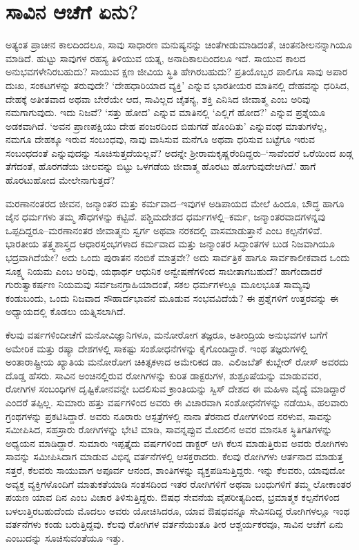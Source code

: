 \section*{ಸಾವಿನ ಆಚೆಗೆ ಏನು?}


ಅತ್ಯಂತ ಪ್ರಾಚೀನ ಕಾಲದಿಂದಲೂ, ಸಾವು ಸಾಧಾರಣ ಮನುಷ್ಯನನ್ನು ಚಿಂತೆಗೀಡು\-ಮಾಡಿ\-ದಂತೆ, ಚಿಂತನಶೀಲನನ್ನಾಗಿಯೂ ಮಾಡಿದೆ. ಹುಟ್ಟು ಸಾವುಗಳ ರಹಸ್ಯ ತಿಳಿಯುವ ಯತ್ನ, ಅನಾದಿಕಾಲದಿಂದಲೂ ಇದೆ. ಸಾಯುವ ಕಾಲದ ಅನುಭವಗಳೇನಿರಬಹುದು? ಸಾಯುವ ಕ್ಷಣ ಜೀವಿಯ ಸ್ಥಿತಿ ಹೇಗಿರಬಹುದು? ಪ್ರತಿಯೊಬ್ಬರ ಪಾಲಿಗೂ ಸಾವು ಅಪಾರ ದುಃಖ, ಸಂಕಟಗಳನ್ನು ತರುವುದೇ? ‘ದೇಹಧಾರಿಯಾದ ವ್ಯಕ್ತಿ’ ಎನ್ನುವ ಭಾರತೀಯರ ಮಾತಿನಲ್ಲಿ ದೇಹವನ್ನು ಧರಿಸಿದ, ದೇಹಕ್ಕೆ ಅತೀತವಾದ ಅಥವಾ ಬೇರೆಯೇ ಆದ, ಸಾವಿಲ್ಲದ ಚೈತನ್ಯ, ಶಕ್ತಿ ಎನಿಸಿದ ಜೀವಾತ್ಮ ಎಂಬ ಅರಿವು ನಮಗಾಗುವುದು. ಇದು ನಿಜವೆ? ‘ಸತ್ತು ಹೋದ’ ಎನ್ನುವ ಮಾತಿನಲ್ಲಿ ‘ಎಲ್ಲಿಗೆ ಹೋದ?’ ಎನ್ನುವ ಪ್ರಶ್ನೆಯೂ ಅಡಕವಾಗಿದೆ. ‘ಅವನ ಪ್ರಾಣಪಕ್ಷಿಯು ದೇಹ ಪಂಜರದಿಂದ ಬಿಡುಗಡೆ ಹೊಂದಿತು’ ಎನ್ನುವಂಥ ಮಾತುಗಳೆಲ್ಲ, ನಮಗೂ ದೇಹಕ್ಕೂ ಇರುವ ಸಂಬಂಧವು, ನಾವು ವಾಸಿಸುವ ಮನೆಗೂ ಅಥವಾ ಧರಿಸುವ ಬಟ್ಟೆಗೂ ಇರುವ ಸಂಬಂಧದಂತೆ ಎನ್ನುವುದನ್ನು ಸೂಚಿಸುತ್ತದೆಯಲ್ಲವೆ? ಅದನ್ನೇ ಶ‍್ರೀರಾಮಕೃಷ್ಣರೆಂದಿದ್ದರು–‘ಸಾವೆಂದರೆ ಒರೆಯಿಂದ ಖಡ್ಗ ತೆಗೆದಂತೆ, ಹೊರಗಡೆಯ ಚೀಲವನ್ನು ಬಿಟ್ಟು ಒಳಗಡೆಯ ಜೀವಾತ್ಮ ಹೊರಟು ಹೋಗುವುದೇ\break ಆಗಿದೆ.’ ಹಾಗೆ ಹೊರಟುಹೋದ ಮೇಲೇನಾಗುತ್ತದೆ?

ಮರಣಾನಂತರದ ಜೀವನ, ಜನ್ಮಾಂತರ ಮತ್ತು ಕರ್ಮವಾದ–ಇವುಗಳ ಅಡಿಪಾಯದ ಮೇಲೆ ಹಿಂದೂ, ಬೌದ್ಧ ಹಾಗೂ ಜೈನ ಧರ್ಮಗಳು ತಮ್ಮ ಸೌಧಗಳನ್ನು ಕಟ್ಟಿವೆ. ಪಶ್ಚಿಮದೇಶದ ಧರ್ಮಗಳಲ್ಲಿ–ಕರ್ಮ, ಜನ್ಮಾಂತರವಾದಗಳನ್ನವು ಒಪ್ಪದಿದ್ದರೂ–ಮರಣಾನಂತರ ಜೀವಾತ್ಮನು ಸ್ವರ್ಗ ಅಥವಾ ನರಕದಲ್ಲಿ ವಾಸಮಾಡುತ್ತಾನೆ ಎಂಬ ಕಲ್ಪನೆಗಳಿವೆ. ಭಾರತೀಯ ತತ್ತ್ವಶಾಸ್ತ್ರದ ಆಧಾರಸ್ತಂಭಗಳಾದ ಕರ್ಮವಾದ ಮತ್ತು ಜನ್ಮಾಂತರ ಸಿದ್ಧಾಂತಗಳ ಬುಡ ನಿಜವಾಗಿಯೂ ಭದ್ರ\-ವಾಗಿದೆಯೇ? ಅದು ಒಂದು ಪುರಾತನ ನಂಬಿಕೆ ಮಾತ್ರವೇ? ಅದು ಸಾರ್ವತ್ರಿಕ ಹಾಗೂ ಸಾರ್ವಕಾಲೀಕವಾದ ಒಂದು ಸೂಕ್ಷ್ಮ ನಿಯಮ ಎಂಬ ಅರಿವು, ಯಥಾರ್ಥ ಆಧುನಿಕ ಅನ್ವೇಷಣೆಗಳಿಂದ ಸಾಬೀತಾಗಬಹುದೆ? ಹಾಗೆಂದಾದರೆ ಗುರುತ್ವಾಕರ್ಷಣ ನಿಯಮವು ಸರ್ವಜನಗ್ರಾಹಿಯಾದಂತೆ, ಸಕಲ ಧರ್ಮಗಳಲ್ಲೂ ಮೂಲಭೂತ ಸಾಮ್ಯವು ಕಂಡುಬಂದು, ಒಂದು ನಿಜವಾದ ಸೌಹಾರ್ದಭಾವನೆ ಮೂಡುವ ಸಂಭವವಿದೆಯೆ? ಈ ಪ್ರಶ್ನೆಗಳಿಗೆ ಉತ್ತರವನ್ನು ಈ ಅಧ್ಯಾಯ\-ದಲ್ಲಿ ಕೊಡಲು ಯತ್ನಿಸಲಾಗಿದೆ.

ಕೆಲವು ವರ್ಷಗಳಿಂದೀಚೆಗೆ ಮನೋವಿಜ್ಞಾನಿಗಳೂ, ಮನೋರೋಗ ತಜ್ಞರೂ, ಅತೀಂದ್ರಿಯ ಅನುಭವಗಳ ಬಗೆಗೆ ಅಮೇರಿಕ ಮತ್ತು ರಷ್ಯಾ ದೇಶಗಳಲ್ಲಿ ಸಾಕಷ್ಟು ಸಂಶೋಧನೆಗಳನ್ನು ಕೈಗೊಂಡಿದ್ದಾರೆ. ಇಂಥ ತಜ್ಞರುಗಳಲ್ಲಿ ಅಂತಾರಾಷ್ಟ್ರೀಯ ಖ್ಯಾತಿಯ ಮನೋರೋಗ ಚಿಕಿತ್ಸಕಳಾದ ಅಮೇರಿಕದ ಡಾ.\ ಎಲಿಜಬೆತ್ ಕುಬ್ಲೇರ್ ರೋಸ್ ಅವರದು ದೊಡ್ಡ ಹೆಸರು. ಸಾವಿನ ಅಂಚಿನಲ್ಲಿರುವ ರೋಗಿಗಳನ್ನು ಕುರಿತ ಡಾಕ್ಟರುಗಳ, ಶುಶ್ರೂಷೆಯನ್ನು ಮಾಡುವವರ, ರೋಗಿಗಳ ಸಂಬಂಧಿಗಳ ದೃಷ್ಟಿಕೋನವನ್ನೇ ಬದಲಿಸುವ ಕ್ರಾಂತಿಯನ್ನು ಸ್ವಿಸ್ ದೇಶದ ಈ ಮಹಿಳಾ ವೈದ್ಯೆ ಮಾಡಿದ್ದಾರೆ ಎಂದರೆ ತಪ್ಪಿಲ್ಲ. ಸುಮಾರು ಹತ್ತು ವರ್ಷಗಳಿಂದ ಅವರು ಈ ವಿಚಾರವಾಗಿ ಸಂಶೋಧನೆಗಳನ್ನು ನಡೆಯಿಸಿ, ಹಲವಾರು ಗ್ರಂಥಗಳನ್ನು ಪ್ರಕಟಿಸಿದ್ದಾರೆ. ಅವರು ನೂರಾರು ಆಸ್ಪತ್ರೆಗಳಲ್ಲಿ ನಾನಾ ತೆರನಾದ ರೋಗಗಳಿಂದ ನರಳುವ, ಸಾವನ್ನು ಸಮೀಪಿಸಿದ, ಸಹಸ್ರಾರು ರೋಗಿಗಳನ್ನು ಭೇಟಿ ಮಾಡಿ, ಸಾವನ್ನಪ್ಪುವ ಮೊದಲಿನ ಅವರ ಮಾನಸಿಕ ಸ್ಥಿತಿಗತಿಗಳನ್ನು ಅಧ್ಯಯನ ಮಾಡಿದ್ದಾರೆ. ಸುಮಾರು ಇಪ್ಪತ್ತೈದು ವರ್ಷಗಳಿಂದ ಡಾಕ್ಟರ್ ಆಗಿ ಕೆಲಸ ಮಾಡುತ್ತಿರುವ ಅವರು ರೋಗಿಗಳು ಸಾವನ್ನು ಸಮೀಪಿಸಿದಾಗ ಮಾಡುವ ವಿಭಿನ್ನ ವರ್ತನೆಗಳಲ್ಲಿ ಆಸಕ್ತರಾದರು. ಕೆಲವು ರೋಗಿಗಳು ಆರ್ತನಾದ ಮಾಡುತ್ತ ಸತ್ತರೆ, ಕೆಲವರು ಸಾಯುವಾಗ ಅಪೂರ್ವ ಆನಂದ, ಶಾಂತಿಗಳನ್ನು ವ್ಯಕ್ತಪಡಿಸುತ್ತಿದ್ದರು. ಇನ್ನು ಕೆಲವರು, ಯಾವುದೋ ಅವ್ಯಕ್ತ ವ್ಯಕ್ತಿಗಳೊಂದಿಗೆ ಮಾತುಕತೆಯಾಡಿ ಸಂತಸದಿಂದ ಇತರ ರೋಗಿಗಳಿಗೆ ಅಥವಾ ಬಂಧುಗಳಿಗೆ ತಮ್ಮ ಲೋಕಾಂತರ ಪಯಣ ಯಾವ ದಿನ ಎಂಬ ವಿಚಾರ ತಿಳಿಸುತ್ತಿದ್ದರು. ಔಷಧ ಸೇವನೆಯ ವೈಪರೀತ್ಯದಿಂದ, ಭ್ರಮಾತ್ಮಕ ಕಲ್ಪನೆಗಳಿಂದ ಬಳಲುತ್ತಿರಬಹುದೆಂದು ಮೊದಲು ಅವರು ಯೋಚಿಸಿದರೂ, ಯಾವ ಔಷಧವನ್ನೂ ಸೇವಿಸದಿದ್ದ ರೋಗಿಗಳಲ್ಲೂ ಇಂಥ ವರ್ತನೆಗಳು ಕಂಡು ಬರುತ್ತಿದ್ದವು. ಕೆಲವು ರೋಗಿಗಳ ವರ್ತನೆಯಂತೂ ತೀರ ಆಶ್ಚರ್ಯಕರವೂ, ಸಾವಿನ ಆಚೆಗೆ ಏನು ಎಂಬುದನ್ನು ಸೂಚಿಸುವಂತೆಯೂ ಇತ್ತು.

